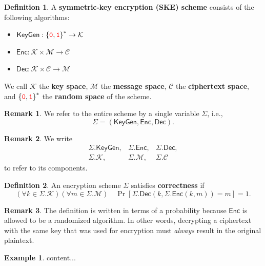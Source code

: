 \documentclass[12pt,openany]{book}
\theoremstyle{definition}
\newtheorem{definition}{Definition}[chapter]
\newtheorem{remark}{Remark}[chapter]
\newtheorem{example}{Example}[chapter]
\newcommand{\set}[1]{\left\{#1\right\}}
\newcommand{\ie}{\textnormal{i.e.}}
\newcommand{\KeyGen}{\mathsf{KeyGen}}
\newcommand{\Enc}{\mathsf{Enc}}
\newcommand{\Dec}{\mathsf{Dec}}
\newcommand{\scheme}{\Sigma}
\newcommand{\keyspace}{\mathcal{K}}
\newcommand{\messagespace}{\mathcal{M}}
\newcommand{\ciphertextspace}{\mathcal{C}}
\newcommand{\zero}{\textcolor{red}{\texttt{0}}}
\newcommand{\one}{\textcolor{red}{\texttt{1}}}
\newcommand{\binaryfield}{\set{\zero,\one}}
\begin{document}
	\begin{tcolorbox}[colback=white,colframe=defcolor,arc=5pt,title={\color{white}\bf Encryption Syntax}]
		\begin{definition}
			A \textbf{symmetric-key encryption (SKE) scheme} consists of the following algorithms: \begin{itemize}
				\item $\KeyGen:\binaryfield^*\to\keyspace$
				\item $\Enc:\keyspace\times\messagespace\to\ciphertextspace$
				\item $\Dec:\keyspace\times\ciphertextspace\to\messagespace$
			\end{itemize} We call $\keyspace$ the \textbf{key space}, $\messagespace$ the \textbf{message space}, $\ciphertextspace$ the \textbf{ciphertext space}, and $\binaryfield^*$ the \textbf{random space} of the scheme.
		\end{definition}
	\end{tcolorbox}
	\begin{remark}
		We refer to the entire scheme by a single variable $\scheme$, \ie, $$
		\scheme=(\KeyGen, \Enc, \Dec).
		$$
	\end{remark}
	\begin{remark}
		We write \[
		\begin{array}{ccc}
			\scheme.\KeyGen, & \scheme.\Enc, & \scheme.\Dec,\\
			\scheme.\keyspace, & \scheme.\messagespace, &\scheme.\ciphertextspace
		\end{array}
		\] to refer to its components.
	\end{remark}
	\vspace{8pt}
	\begin{tcolorbox}[colback=white,colframe=defcolor,arc=5pt,title={\color{white}\bf SKE Correctness}]
		\begin{definition}
			An encryption scheme $\scheme$ satisfies \textbf{correctness} if \[
			\left(\forall k\in\scheme.\keyspace\right)\left(\forall m\in\scheme.\messagespace
			\right)\quad\Pr\left[\scheme.\Dec(k, \scheme.\Enc(k,m))=m\right]=1.
			\]
		\end{definition}
	\end{tcolorbox}
	\begin{remark}
		The definition is written in terms of a probability because $\Enc$ is allowed to be a randomized algorithm. In other words, decrypting a ciphertext with the same key that was used for encryption must \textit{always} result in the original plaintext.
	\end{remark}
	\vspace{4pt}
	\begin{example}
		content...
	\end{example}
	
\end{document}
